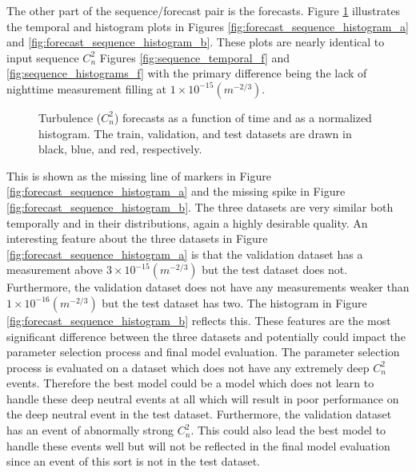 The other part of the sequence/forecast pair is the forecasts. Figure \ref{fig:forecast_sequence_histogram} illustrates the temporal and histogram plots in Figures \ref{fig:forecast_sequence_histogram_a} and \ref{fig:forecast_sequence_histogram_b}. These plots are nearly identical to input sequence $C_{n}^{2}$ Figures \ref{fig:sequence_temporal_f} and \ref{fig:sequence_histograms_f} with the primary difference being the lack of nighttime measurement filling at $1 \times 10^{-15} (m^{-2/3})$.
\begin{figure}[h!]
	\centering
	\hfill
	\caption{Turbulence ($C_{n}^{2}$) forecasts as a function of time and as a normalized histogram. The train, validation, and test datasets are drawn in black, blue, and red, respectively.}
	\label{fig:forecast_sequence_histogram}
\end{figure}
This is shown as the missing line of markers in Figure \ref{fig:forecast_sequence_histogram_a} and the missing spike in Figure \ref{fig:forecast_sequence_histogram_b}. The three datasets are very similar both temporally and in their distributions, again a highly desirable quality.  An interesting feature about the three datasets in Figure \ref{fig:forecast_sequence_histogram_a} is that the validation dataset has a measurement above $3 \times 10^{-15} (m^{-2/3})$ but the test dataset does not. Furthermore, the validation dataset does not have any measurements weaker than $1 \times 10^{-16} (m^{-2/3})$ but the test dataset has two. The histogram in Figure \ref{fig:forecast_sequence_histogram_b} reflects this. These features are the most significant difference between the three datasets and potentially could impact the parameter selection process and final model evaluation. The parameter selection process is evaluated on a dataset which does not have any extremely deep $C_{n}^{2}$ events. Therefore the best model could be a model which does not learn to handle these deep neutral events at all which will result in poor performance on the deep neutral event in the test dataset. Furthermore, the validation dataset has an event of abnormally strong $C_{n}^{2}$. This could also lead the best model to handle these events well but will not be reflected in the final model evaluation since an event of this sort is not in the test dataset.

